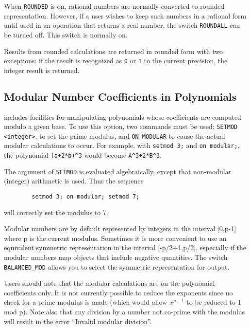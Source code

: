 When {\tt ROUNDED} is on, rational numbers are normally converted to
rounded representation.  However, if a user wishes to keep such numbers in
a rational form until used in an operation that returns a real number,
the switch {\tt ROUNDALL} can be turned off.  This
switch is normally on.

Results from rounded calculations are returned in rounded form with two
exceptions: if the result is recognized as {\tt 0} or {\tt 1} to the
current precision, the integer result is returned.

\subsection{Modular Number Coefficients in Polynomials}
{\REDUCE} includes facilities for manipulating polynomials whose
coefficients are computed modulo a given base.  To use this option, two
commands must be used; {\tt SETMOD} {\tt <integer>}, to set
the prime modulus, and {\tt ON MODULAR} to cause the
actual modular calculations to occur.
For example, with {\tt setmod 3;} and {\tt on modular;}, the polynomial
{\tt (a+2*b)\verb|^|3} would become {\tt A\verb|^|3+2*B\verb|^|3}.

The argument of {\tt SETMOD} is evaluated algebraically, except that
non-modular (integer) arithmetic is used.  Thus the sequence
\begin{verbatim}
        setmod 3; on modular; setmod 7;
\end{verbatim}
will correctly set the modulus to 7.

Modular numbers are by default represented by integers in the interval
[0,p-1] where p is the current modulus.  Sometimes it is more convenient
to use an equivalent symmetric representation in the interval
[-p/2+1,p/2], especially if the modular numbers map objects that include
negative quantities.  The switch {\tt BALANCED\_MOD}
allows you to select the symmetric representation for output.

Users should note that the modular calculations are on the polynomial
coefficients only.  It is not currently possible to reduce the exponents
since no check for a prime modulus is made (which would allow
$x^{p-1}$ to be reduced to 1 mod p).  Note also that any division by a
number not co-prime with the modulus will result in the error ``Invalid
modular division''.


